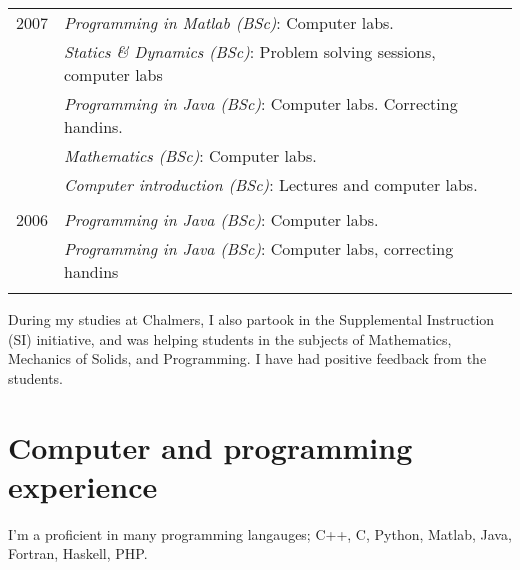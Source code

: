 \documentclass[a4paper,10pt]{article} %
\begin{document}
{\begin{tabular}{r|p{11cm}}

\textsc{2007} 
              & \emph{Programming in Matlab (BSc)}: \footnotesize{Computer labs.}\\
              & \emph{Statics \& Dynamics (BSc)}: \footnotesize{Problem solving sessions, computer labs}\\
              & \emph{Programming in Java (BSc)}: \footnotesize{Computer labs. Correcting handins.}\\
              & \emph{Mathematics (BSc)}: \footnotesize{Computer labs.}\\
              & \emph{Computer introduction (BSc)}: \footnotesize{Lectures and computer labs.}\\
\multicolumn{2}{c}{} \\


\textsc{2006} 
              & \emph{Programming in Java (BSc)}: \footnotesize{Computer labs.}\\
              & \emph{Programming in Java (BSc)}: \footnotesize{Computer labs, correcting handins}\\
\multicolumn{2}{c}{} \\

% 

\end{tabular}

During my studies at Chalmers, I also partook in the Supplemental Instruction (SI) initiative, and was helping students in the subjects of Mathematics, Mechanics of Solids, and Programming.
I have had positive feedback from the students.



\section{Computer and programming experience}

I'm a proficient in many programming langauges; C++, C, Python, Matlab, Java, Fortran, Haskell, PHP.

}
\end{document}
